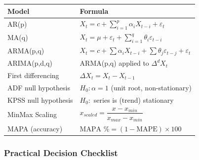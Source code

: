 \documentclass[12pt,openany]{book}
\begin{document}
\begin{center}
\begin{tabular}{|L{0.28\textwidth}|L{0.62\textwidth}|}
\hline
Model & Formula \\
\hline
AR(p) & \(X_t = c + \sum_{i=1}^p \alpha_i X_{t-i} + \varepsilon_t\) \\
\hline
MA(q) & \(X_t = \mu + \varepsilon_t + \sum_{i=1}^q \theta_i \varepsilon_{t-i}\) \\
\hline
ARMA(p,q) & \(X_t = c + \sum \alpha_i X_{t-i} + \sum \theta_j \varepsilon_{t-j} + \varepsilon_t\) \\
\hline
ARIMA(p,d,q) & ARMA(p,q) applied to \(\Delta^d X_t\) \\
\hline
First differencing & \(\Delta X_t = X_t - X_{t-1}\) \\
\hline
ADF null hypothesis & \(H_0: \alpha = 1\) (unit root, non-stationary) \\
\hline
KPSS null hypothesis & \(H_0:\) series is (trend) stationary \\
\hline
MinMax Scaling & \(x_{scaled} = \dfrac{x - x_{min}}{x_{max}-x_{min}}\) \\
\hline
MAPA (accuracy) & \(\text{MAPA \%} = (1-\text{MAPE}) \times 100\) \\
\hline
\end{tabular}
\end{center}

\subsubsection{Practical Decision Checklist}
\end{document}
